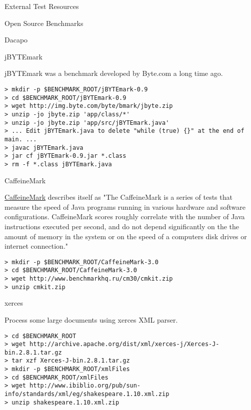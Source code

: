 \begin{section}{External Test Resources}
\begin{subsection}{Open Source Benchmarks}
\begin{subsubsection}{Dacapo}
\end{subsubsection}

\begin{subsubsection}{jBYTEmark}

jBYTEmark was a benchmark developed by Byte.com a long time ago.

\begin{lstlisting}
> mkdir -p $BENCHMARK_ROOT/jBYTEmark-0.9
> cd $BENCHMARK_ROOT/jBYTEmark-0.9
> wget http://img.byte.com/byte/bmark/jbyte.zip
> unzip -jo jbyte.zip 'app/class/*'
> unzip -jo jbyte.zip 'app/src/jBYTEmark.java'
> ... Edit jBYTEmark.java to delete "while (true) {}" at the end of main. ...
> javac jBYTEmark.java
> jar cf jBYTEmark-0.9.jar *.class
> rm -f *.class jBYTEmark.java
\end{lstlisting}

\end{subsubsection}

\begin{subsubsection}{CaffeineMark}

\href{http://www.benchmarkhq.ru/cm30/info.html}{CaffeineMark} describes itself as "The CaffeineMark is a series of tests that measure the speed of Java programs running in various hardware and software configurations. CaffeineMark scores roughly correlate with the number of Java instructions executed per second, and do not depend significantly on the the amount of memory in the system or on the speed of a computers disk drives or internet connection."

\begin{lstlisting}
> mkdir -p $BENCHMARK_ROOT/CaffeineMark-3.0
> cd $BENCHMARK_ROOT/CaffeineMark-3.0
> wget http://www.benchmarkhq.ru/cm30/cmkit.zip
> unzip cmkit.zip
\end{lstlisting}

\end{subsubsection}

\begin{subsubsection}{xerces}

Process some large documents using xerces XML parser.

\begin{lstlisting}
> cd $BENCHMARK_ROOT
> wget http://archive.apache.org/dist/xml/xerces-j/Xerces-J-bin.2.8.1.tar.gz
> tar xzf Xerces-J-bin.2.8.1.tar.gz
> mkdir -p $BENCHMARK_ROOT/xmlFiles
> cd $BENCHMARK_ROOT/xmlFiles
> wget http://www.ibiblio.org/pub/sun-info/standards/xml/eg/shakespeare.1.10.xml.zip
> unzip shakespeare.1.10.xml.zip
\end{lstlisting}
\end{subsubsection}


\end{subsection}
\end{section}
